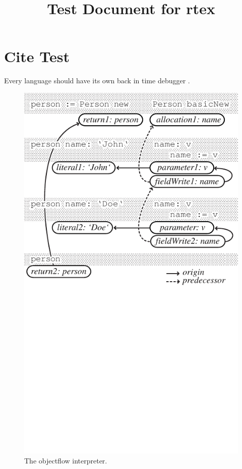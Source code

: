 \documentclass[10pt]{article}
\begin{document}
\title{Test Document for rtex}

\section{Cite Test}
\label{sec:citetest}
Every language should have its own back in time debugger \cite{Lien08d}.
\begin{figure}[ht]
	\centering
	\includegraphics{objectflow.pdf}
	\caption{The objectflow interpreter.}
	\label{fig:objectflow}
\end{figure}
\end{document}
